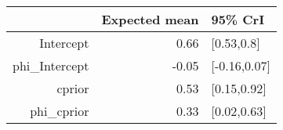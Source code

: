 \begin{tabular}{rrl}
  \hline
 & Expected mean & 95\% CrI \\ 
  \hline
Intercept & 0.66 & [0.53,0.8] \\ 
  phi\_Intercept & -0.05 & [-0.16,0.07] \\ 
  cprior & 0.53 & [0.15,0.92] \\ 
  phi\_cprior & 0.33 & [0.02,0.63] \\ 
   \hline
\end{tabular}

